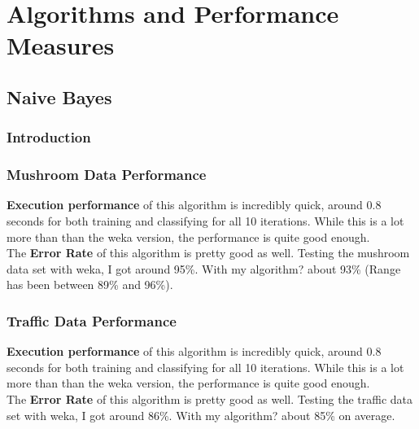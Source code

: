 \documentclass{article}
\begin{document}

\section{Algorithms and Performance Measures}
\subsection{Naive Bayes}
\subsubsection{Introduction}
\subsubsection{Mushroom Data Performance}
\textbf{Execution performance} of this algorithm is incredibly quick, around 0.8 seconds for both training and classifying for all 10 iterations.  While this is a lot more than than the weka version, the performance is quite good enough.\\
The \textbf{Error Rate} of this algorithm is pretty good as well.  Testing the mushroom data set with weka, I got around 95\%.  With my algorithm? about 93\% (Range has been between 89\% and 96\%).
\subsubsection{Traffic Data Performance}
\textbf{Execution performance} of this algorithm is incredibly quick, around 0.8 seconds for both training and classifying for all 10 iterations.  While this is a lot more than than the weka version, the performance is quite good enough.\\
The \textbf{Error Rate} of this algorithm is pretty good as well.  Testing the traffic data set with weka, I got around 86\%.  With my algorithm? about 85\% on average.
\end{document}
